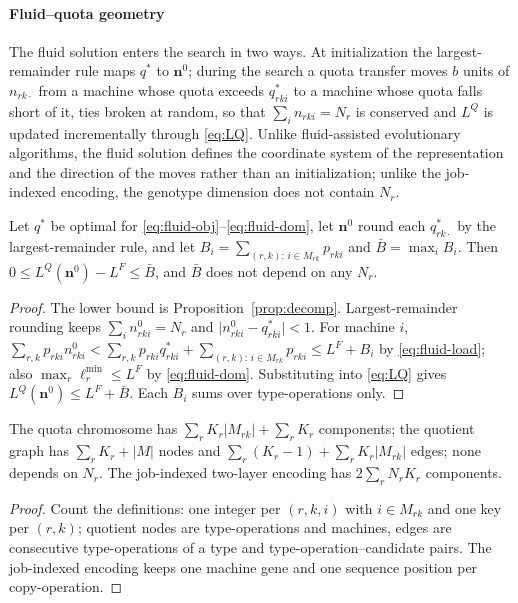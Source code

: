 \paragraph{Fluid--quota geometry} The fluid solution enters the search in two ways. At initialization the
largest-remainder rule maps $q^*$ to $\mathbf{n}^0$; during the search a quota transfer moves $b$ units of $n_{rk\cdot}$
from a machine whose quota exceeds $q^*_{rki}$ to a machine whose quota falls short of it, ties broken at random, so that
$\sum_i n_{rki} = N_r$ is conserved and $L^Q$ is updated incrementally through \eqref{eq:LQ}. Unlike fluid-assisted
evolutionary algorithms, the fluid solution defines the coordinate system of the representation and the direction of
the moves rather than an initialization; unlike the job-indexed encoding, the genotype dimension does not contain $N_r$.

\begin{proposition}\label{prop:rounding}
Let $q^*$ be optimal for \eqref{eq:fluid-obj}--\eqref{eq:fluid-dom}, let $\mathbf{n}^0$ round each $q^*_{rk\cdot}$ by the
largest-remainder rule, and let $B_i = \sum_{(r,k):\, i \in M_{rk}} p_{rki}$ and $\bar B = \max_i B_i$. Then
$0 \le L^Q(\mathbf{n}^0) - L^F \le \bar B$, and $\bar B$ does not depend on any $N_r$.
\end{proposition}
\begin{proof}
The lower bound is Proposition~\ref{prop:decomp}. Largest-remainder rounding keeps $\sum_i n^0_{rki} = N_r$ and
$\lvert n^0_{rki} - q^*_{rki}\rvert < 1$. For machine $i$,
$\sum_{r,k} p_{rki} n^0_{rki} < \sum_{r,k} p_{rki} q^*_{rki} + \sum_{(r,k):\, i \in M_{rk}} p_{rki} \le L^F + B_i$ by
\eqref{eq:fluid-load}; also $\max_r \ell_r^{\min} \le L^F$ by \eqref{eq:fluid-dom}. Substituting into \eqref{eq:LQ}
gives $L^Q(\mathbf{n}^0) \le L^F + \bar B$. Each $B_i$ sums over type-operations only.
\end{proof}

\begin{proposition}\label{prop:dims}
The quota chromosome has $\sum_r K_r \lvert M_{rk}\rvert + \sum_r K_r$ components; the quotient graph has
$\sum_r K_r + \lvert M\rvert$ nodes and $\sum_r (K_r - 1) + \sum_r K_r \lvert M_{rk}\rvert$ edges; none depends on $N_r$.
The job-indexed two-layer encoding has $2\sum_r N_r K_r$ components.
\end{proposition}
\begin{proof}
Count the definitions: one integer per $(r,k,i)$ with $i \in M_{rk}$ and one key per $(r,k)$; quotient nodes are
type-operations and machines, edges are consecutive type-operations of a type and type-operation--candidate pairs. The
job-indexed encoding keeps one machine gene and one sequence position per copy-operation.
\end{proof}

